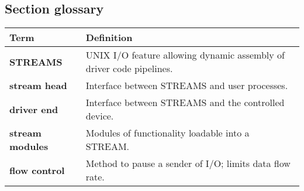 \subsection{Section glossary}
\begin{tabular}{p{}p{}}
    \toprule
    \textbf{Term} & \textbf{Definition} \\
    \midrule
    \textbf{STREAMS} & UNIX I/O feature allowing dynamic assembly of driver code pipelines. \\
    \textbf{stream head} & Interface between STREAMS and user processes. \\
    \textbf{driver end} & Interface between STREAMS and the controlled device. \\
    \textbf{stream modules} & Modules of functionality loadable into a STREAM. \\
    \textbf{flow control} & Method to pause a sender of I/O; limits data flow rate. \\
    \bottomrule
\end{tabular}

